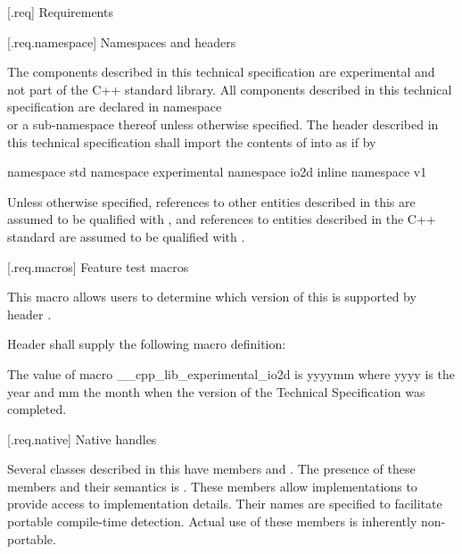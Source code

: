 [\iotwod.req] {Requirements}

 [\iotwod.req.namespace] {Namespaces and headers}

\pnum
The components described in this technical specification are experimental and 
not part of the C++ standard library. All components described in this 
technical specification are declared in namespace\\  or a sub-namespace thereof unless 
otherwise specified. The header described in this technical specification shall 
import the contents of  into 
 as if by

\pnum
\begin{codeblock}
namespace std {
  namespace experimental {
    namespace io2d {
      inline namespace v1 { }
    }
  }
}
\end{codeblock}

\pnum
Unless otherwise specified, references to other entities described in this \documenttypename{} are assumed to be qualified with , and references to entities
described in the C++ standard are assumed to be qualified with .

 [\iotwod.req.macros] {Feature test macros}

\pnum
This macro allows users to determine which version of this \documenttypename{} is supported by header .

\pnum
Header  shall supply the following macro definition:

\pnum
{}

\pnum
\enternote
The value of macro __cpp_lib_experimental_io2d is yyyymm where yyyy is the year
and mm the month when the version of the Technical Specification was completed. \exitnote

 [\iotwod.req.native] {Native handles}

\pnum
Several classes described in this \documenttypename{} have members 
 and . The presence of these 
members and their semantics is .
\enternote
These members allow implementations to provide access to implementation 
details. Their names are specified to facilitate portable compile-time 
detection. Actual use of these members is inherently non-portable.
\exitnote


